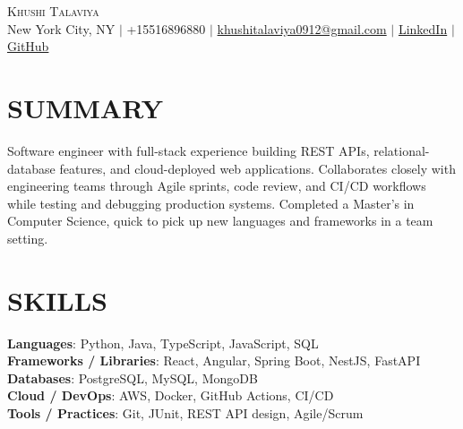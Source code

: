 \documentclass[letterpaper,11pt]{article}
\begin{document}
\begin{center}
    {\Huge \scshape Khushi Talaviya} \\ \vspace{2pt}
    \vspace{4pt}
    \small
    New York City, NY $|$
    \small
    +15516896880 $|$
    \href{mailto:khushitalaviya0912@gmail.com}{khushitalaviya0912@gmail.com} $|$
    \href{https://www.linkedin.com/in/khushitalaviya/}{LinkedIn} $|$
    \href{https://github.com/talaviyakhushi}{GitHub}
\end{center}

\section{SUMMARY}
\vspace{5pt}
\small{Software engineer with full-stack experience building REST APIs, relational-database features, and cloud-deployed web applications. Collaborates closely with engineering teams through Agile sprints, code review, and CI/CD workflows while testing and debugging production systems. Completed a Master's in Computer Science, quick to pick up new languages and frameworks in a team setting.}

\vspace{2pt}
\section{SKILLS}
\vspace{5pt}
\begin{itemize}[leftmargin=0in, label={}]
\small{\item{
\textbf{Languages}{: Python, Java, TypeScript, JavaScript, SQL} \\
\textbf{Frameworks / Libraries}{: React, Angular, Spring Boot, NestJS, FastAPI} \\
\textbf{Databases}{: PostgreSQL, MySQL, MongoDB} \\
\textbf{Cloud / DevOps}{: AWS, Docker, GitHub Actions, CI/CD} \\
\textbf{Tools / Practices}{: Git, JUnit, REST API design, Agile/Scrum}
}}
\end{itemize}
\vspace{-10pt}

\end{document}
